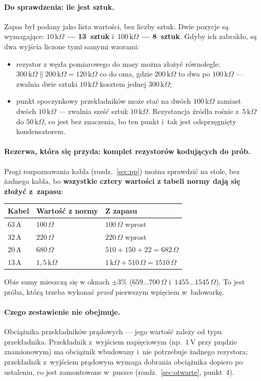 \documentclass[a4paper,11pt]{article}
\newcommand{\ohm}{\,\Omega}
\newcommand{\kohm}{\,\mathrm{k}\Omega}
\newcommand{\volt}{\,\mathrm{V}}
\newcommand{\amp}{\,\mathrm{A}}
\begin{document}
\paragraph{Do sprawdzenia: ile jest sztuk.} Zapas był podany jako lista wartości,
bez liczby sztuk. Dwie pozycje są wymagające: \textbf{$10\kohm$ --- 13~sztuk}
i~\textbf{$100\kohm$ --- 8~sztuk}. Gdyby ich zabrakło, są dwa wyjścia liczone tymi
samymi wzorami:

\begin{itemize}
\item rezystor z węzła pomiarowego do masy można złożyć równolegle:
      $300\kohm \parallel 200\kohm = 120\kohm$ co do oma, gdzie $200\kohm$ to dwa
      po $100\kohm$ --- zwalnia dwie sztuki $10\kohm$ kosztem jednej $300\kohm$;
\item punkt spoczynkowy przekładników może stać na dwóch $100\kohm$ zamiast dwóch
      $10\kohm$ --- zwalnia sześć sztuk $10\kohm$. Rezystancja źródła rośnie
      z~$5\kohm$ do $50\kohm$, co jest bez znaczenia, bo ten punkt i~tak jest
      odsprzęgnięty kondensatorem.
\end{itemize}

\paragraph{Rezerwa, która się przyda: komplet rezystorów kodujących do prób.}
Progi rozpoznawania kabla (rozdz.~\ref{sec:pp}) można sprawdzić na stole, bez
żadnego kabla, bo \textbf{wszystkie cztery wartości z tabeli normy dają się złożyć
z~zapasu}:

\begin{center}
\begin{tabular}{lll}
\toprule
Kabel & Wartość z normy & Z zapasu \\
\midrule
$63\amp$ & $100\ohm$   & $100\ohm$ wprost \\
$32\amp$ & $220\ohm$   & $220\ohm$ wprost \\
$20\amp$ & $680\ohm$   & $510+150+22=682\ohm$ \\
$13\amp$ & $1{,}5\kohm$ & $1\kohm+510\ohm=1510\ohm$ \\
\bottomrule
\end{tabular}
\end{center}

Obie sumy mieszczą się w oknach $\pm3\%$ ($659\ldots700\ohm$
i~$1455\ldots1545\ohm$). To jest próba, którą trzeba wykonać \emph{przed} pierwszym
wpięciem w~ładowarkę.

\paragraph{Czego zestawienie nie obejmuje.} Obciążnika przekładników prądowych ---
jego wartość zależy od typu przekładnika. Przekładnik z~wyjściem napięciowym
(np.~$1\volt$ przy prądzie znamionowym) ma obciążnik wbudowany i~nie potrzebuje
żadnego rezystora; przekładnik z~wyjściem prądowym wymaga dobrania obciążnika
dopiero po ustaleniu, co jest zamontowane w~puszce
(rozdz.~\ref{sec:otwarte}, punkt~4).
\end{document}
